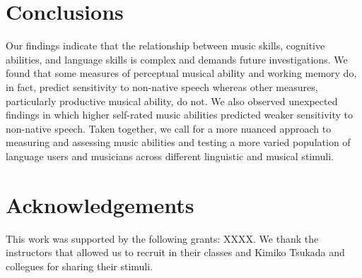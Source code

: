 \documentclass[a4paper]{article}
\begin{document}
\section{Conclusions}

Our findings indicate that the relationship between music skills, cognitive abilities, and language skills is complex and demands future investigations. We found that some measures of perceptual musical ability and working memory do, in fact, predict sensitivity to non-native speech whereas other measures, particularly productive musical ability, do not. We also observed unexpected findings in which higher self-rated music abilities predicted weaker sensitivity to non-native speech. Taken together, we call for a more nuanced approach to measuring and assessing music abilities and testing a more varied population of language users and musicians across different linguistic and musical stimuli.

\section{Acknowledgements}

This work was supported by the following grants: XXXX. We thank the instructors that allowed us to recruit in their classes and Kimiko Tsukada and collegues for sharing their stimuli.



\end{document}
